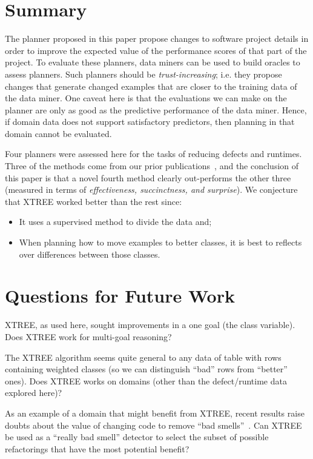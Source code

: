 \documentclass{sig-alternate}
\newcommand{\bi}{\begin{itemize}}
\newcommand{\ei}{\end{itemize}}
\begin{document}
\section{Summary}

The planner proposed in this paper propose changes to software project details in order to improve the expected
value of the performance scores of that part of the project.
To evaluate these planners,
data miners can be used to build oracles to assess planners.
Such planners should be {\em trust-increasing}; i.e. they propose changes that generate
changed examples that are closer to the training data of the data miner.
One caveat here is that the evaluations we can make on the planner are only as good as the predictive
performance of the data miner. Hence, if domain data does not support satisfactory predictors, then
planning in that domain cannot be evaluated.

Four planners were assessed here for the tasks of reducing defects and runtimes. 
Three of the methods come from our prior publications~\cite{me12c,krishna15}, and the conclusion of this
paper is that a novel fourth method clearly out-performs the other three
(measured in terms of {\em effectiveness, succinctness, and surprise}).
We conjecture that XTREE worked better than the rest since:
\bi
\item
It uses a supervised method to divide the data and;
\item
When planning how to move examples to better classes, it is   best to  reflects over 
differences between those classes.
\ei


\section{Questions for Future Work}

XTREE, as used here, sought improvements in a one goal (the   class variable). Does XTREE work for multi-goal reasoning?

 The XTREE algorithm seems quite general to any data of table with rows containing
weighted classes (so we can distinguish ``bad'' rows from ``better'' ones). 
Does   XTREE works  on   domains (other than the  defect/runtime data explored here)?

As an example of a domain that might benefit from XTREE, recent results raise doubts about
the value of changing code to remove ``bad smells''~\cite{Sjoberg13}. Can XTREE be used as a ``really bad smell''
detector to select the subset of possible refactorings that have the most   potential benefit?
\end{document}
